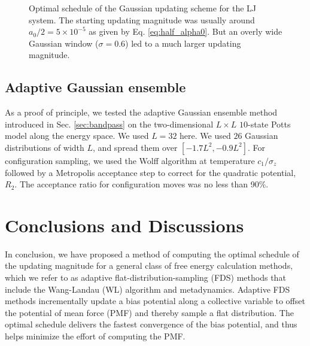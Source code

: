 \documentclass[reprint, superscriptaddress, floatfix]{revtex4-1}
\begin{document}
\begin{figure}[h]
\begin{center}
  \caption{
    \label{fig:lj_alpha}
    Optimal schedule of the Gaussian updating scheme
    for the LJ system.
    The starting updating magnitude was usually
    around $a_0/2 = 5\times10^{-5}$
    as given by Eq. \eqref{eq:half_alpha0}.
    But an overly wide Gaussian window ($\sigma = 0.6$)
    led to a much larger updating magnitude.
  }
\end{center}
\end{figure}




\subsection{\label{sec:potts}
Adaptive Gaussian ensemble}


As a proof of principle,
we tested the adaptive Gaussian ensemble method
introduced in Sec. \ref{sec:bandpass}
on the two-dimensional $L\times L$ $10$-state
Potts model\cite{wu1982, newman, wang2001, wang2001pre}
along the energy space.
%
We used $L = 32$ here.
%
We used $26$ Gaussian distributions of width $L$,
and spread them over $[-1.7L^2, -0.9L^2]$.
%
For configuration sampling,
we used the Wolff algorithm\cite{wolff1989, newman}
at temperature $c_1/\sigma_z$
followed by a Metropolis acceptance step
to correct for the quadratic potential, $R_2$.
%
The acceptance ratio for configuration moves
was no less than 90\%.





\section{\label{sec:conclusion}
Conclusions and Discussions}



In conclusion,
we have proposed a method of computing
the optimal schedule of the updating magnitude
for a general class of free energy calculation methods,
which we refer to as adaptive flat-distribution-sampling (FDS) methods
that include the Wang-Landau (WL) algorithm and metadynamics.
%
Adaptive FDS methods
incrementally update a bias potential
along a collective variable
to offset the potential of mean force (PMF)
and thereby sample a flat distribution.
%
The optimal schedule delivers the fastest convergence
of the bias potential,
and thus helps minimize the effort
of computing the PMF.
\end{document}
